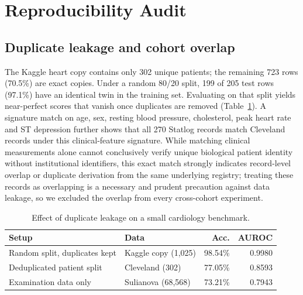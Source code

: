 \documentclass[journal]{IEEEtran}
\begin{document}
\section{Reproducibility Audit}\label{sec:audit}
\subsection{Duplicate leakage and cohort overlap}
The Kaggle heart copy contains only 302 unique patients; the remaining 723 rows (70.5\%) are exact copies. Under a random 80/20 split, 199 of 205 test rows (97.1\%) have an identical twin in the training set. Evaluating on that split yields near-perfect scores that vanish once duplicates are removed (Table~\ref{tab:leak}). A signature match on age, sex, resting blood pressure, cholesterol, peak heart rate and ST depression further shows that all 270 Statlog records match Cleveland records under this clinical-feature signature. While matching clinical measurements alone cannot conclusively verify unique biological patient identity without institutional identifiers, this exact match strongly indicates record-level overlap or duplicate derivation from the same underlying registry; treating these records as overlapping is a necessary and prudent precaution against data leakage, so we excluded the overlap from every cross-cohort experiment.

\begin{table}[t]
\caption{Effect of duplicate leakage on a small cardiology benchmark.}
\label{tab:leak}
\centering\footnotesize
\begin{tabular}{p{2.6cm}p{2.3cm}rr}
\toprule
Setup & Data & Acc. & AUROC\\
\midrule
Random split, duplicates kept & Kaggle copy (1{,}025) & 98.54\% & 0.9980\\
Deduplicated patient split & Cleveland (302) & 77.05\% & 0.8593\\
Examination data only & Sulianova (68{,}568) & 73.21\% & 0.7943\\
\bottomrule
\end{tabular}
\end{table}
\end{document}
